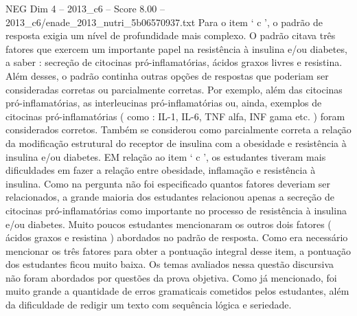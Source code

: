\begin{textsample}{NEG Dim 4 – 2013\_c6 – Score 8.00 – 2013\_c6/enade\_2013\_nutri\_5b06570937.txt}
Para o item ‘ c ’, o padrão de resposta exigia um nível de profundidade mais complexo.
O padrão citava três fatores que exercem um importante papel na resistência à insulina e/ou diabetes, a saber : secreção de citocinas pró-inflamatórias, ácidos graxos livres e resistina.
Além desses, o padrão continha outras opções de respostas que poderiam ser consideradas corretas ou parcialmente corretas.
Por exemplo, além das citocinas pró-inflamatórias, as interleucinas pró-inflamatórias ou, ainda, exemplos de citocinas pró-inflamatórias ( como : IL-1, IL-6, TNF alfa, INF gama etc. ) foram considerados corretos.
Também se considerou como parcialmente correta a relação da modificação estrutural do receptor de insulina com a obesidade e resistência à insulina e/ou diabetes.
EM relação ao item ‘ c ’, os estudantes tiveram mais dificuldades em fazer a relação entre obesidade, inflamação e resistência à insulina.
Como na pergunta não foi especificado quantos fatores deveriam ser relacionados, a grande maioria dos estudantes relacionou apenas a secreção de citocinas pró-inflamatórias como importante no processo de resistência à insulina e/ou diabetes.
Muito poucos estudantes mencionaram os outros dois fatores ( ácidos graxos e resistina ) abordados no padrão de resposta.
Como era necessário mencionar os três fatores para obter a pontuação integral desse item, a pontuação dos estudantes ficou muito baixa.
Os temas avaliados nessa questão discursiva não foram abordados por questões da prova objetiva.
Como já mencionado, foi muito grande a quantidade de erros gramaticais cometidos pelos estudantes, além da dificuldade de redigir um texto com sequência lógica e seriedade.

\end{textsample}
